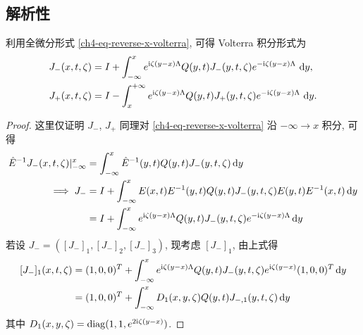 \subsection{解析性}
利用全微分形式 \eqref{ch4-eq-reverse-x-volterra}, 可得 Volterra 积分形式为
\begin{equation}
    \begin{aligned}
        J_{-}(x, t, \zeta) & = I + \int_{-\infty}^{x} e^{\mathrm{i} \zeta (y-x) \Lambda} Q(y, t) J_{-}(y, t, \zeta) e^{-\mathrm{i} \zeta (y-x) \Lambda} \, \mathop{}\!\mathrm{d} y, \\
        J_{+}(x, t, \zeta) & = I - \int_{x}^{+\infty} e^{\mathrm{i} \zeta (y-x) \Lambda} Q(y, t) J_{+}(y, t, \zeta) e^{-\mathrm{i} \zeta (y-x) \Lambda} \, \mathop{}\!\mathrm{d} y.
    \end{aligned}
\end{equation}
\begin{proof}
    这里仅证明 $J_{-}$, $J_{+}$ 同理对 \eqref{ch4-eq-reverse-x-volterra} 沿 $ -\infty \to x $ 积分, 可得
    \begin{equation}
        \begin{aligned}
            \hat{E}^{-1} J_{-}(x, t, \zeta)|_{-\infty}^{x} & = \int_{-\infty}^{x} \hat{E}^{-1}(y,t) Q(y, t) J_{-}(y, t, \zeta) \mathop{}\!\mathrm{d} y                                              \\
            \implies J_{-}                                 & = I + \int_{-\infty}^{x} E(x,t) E^{-1}(y, t) Q(y, t) J_{-}(y, t, \zeta) E(y, t) E^{-1}(x, t) \mathop{}\!\mathrm{d} y                   \\
                                                           & = I + \int_{-\infty}^{x} e^{\mathrm{i} \zeta (y-x) \Lambda} Q(y, t) J_{-}(y, t, \zeta) e^{-\mathrm{i} \zeta (y-x) \Lambda} \mathop{}\!\mathrm{d} y
        \end{aligned}
        \label{ch4-eq-volterra-J}
    \end{equation}
    若设 $J_{-} = ([J_{-}]_{1}, [J_{-}]_{2}, [J_{-}]_{3})$, 现考虑 $[J_{-}]_{1}$, 由上式得
    \begin{equation}
        \begin{aligned}
            \relax  [J_{-}]_{1}(x, t, \zeta) & = (1,0,0)^{T} + \int_{-\infty}^{x} e^{\mathrm{i} \zeta (y-x) \Lambda} Q(y, t) J_{-}(y, t, \zeta) e^{\mathrm{i} \zeta (y-x)}(1,0,0)^{T} \mathop{}\!\mathrm{d} y \\
                                             & = (1,0,0)^{T} + \int_{-\infty}^{x} D_{1}(x,y,\zeta) Q(y, t) J_{-,1}(y, t, \zeta)\mathop{}\!\mathrm{d} y
        \end{aligned}
    \end{equation}
    其中 $D_{1}(x,y,\zeta) = \operatorname{diag}( 1,1,e^{2\mathrm{i}\zeta(y-x)})$.

\end{proof}
